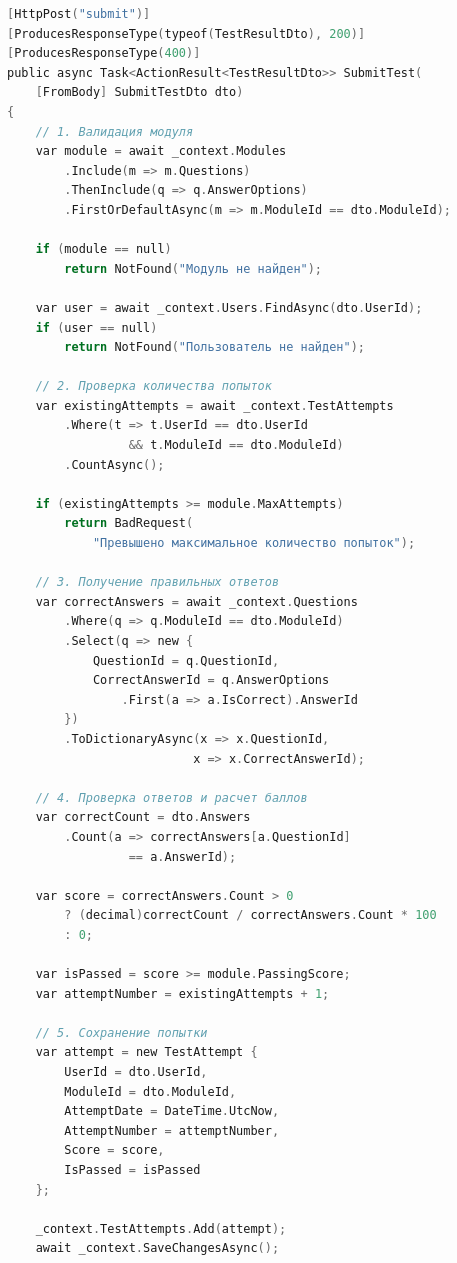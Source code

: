 \begin{lstlisting}[language=C, basicstyle=\ttfamily\small]
[HttpPost("submit")]
[ProducesResponseType(typeof(TestResultDto), 200)]
[ProducesResponseType(400)]
public async Task<ActionResult<TestResultDto>> SubmitTest(
    [FromBody] SubmitTestDto dto)
{
    // 1. Валидация модуля
    var module = await _context.Modules
        .Include(m => m.Questions)
        .ThenInclude(q => q.AnswerOptions)
        .FirstOrDefaultAsync(m => m.ModuleId == dto.ModuleId);
    
    if (module == null)
        return NotFound("Модуль не найден");
    
    var user = await _context.Users.FindAsync(dto.UserId);
    if (user == null)
        return NotFound("Пользователь не найден");
    
    // 2. Проверка количества попыток
    var existingAttempts = await _context.TestAttempts
        .Where(t => t.UserId == dto.UserId 
                 && t.ModuleId == dto.ModuleId)
        .CountAsync();
    
    if (existingAttempts >= module.MaxAttempts)
        return BadRequest(
            "Превышено максимальное количество попыток");
    
    // 3. Получение правильных ответов
    var correctAnswers = await _context.Questions
        .Where(q => q.ModuleId == dto.ModuleId)
        .Select(q => new {
            QuestionId = q.QuestionId,
            CorrectAnswerId = q.AnswerOptions
                .First(a => a.IsCorrect).AnswerId
        })
        .ToDictionaryAsync(x => x.QuestionId, 
                          x => x.CorrectAnswerId);
    
    // 4. Проверка ответов и расчет баллов
    var correctCount = dto.Answers
        .Count(a => correctAnswers[a.QuestionId] 
                 == a.AnswerId);
    
    var score = correctAnswers.Count > 0 
        ? (decimal)correctCount / correctAnswers.Count * 100 
        : 0;
    
    var isPassed = score >= module.PassingScore;
    var attemptNumber = existingAttempts + 1;
    
    // 5. Сохранение попытки
    var attempt = new TestAttempt {
        UserId = dto.UserId,
        ModuleId = dto.ModuleId,
        AttemptDate = DateTime.UtcNow,
        AttemptNumber = attemptNumber,
        Score = score,
        IsPassed = isPassed
    };
    
    _context.TestAttempts.Add(attempt);
    await _context.SaveChangesAsync();
    

\end{lstlisting}
